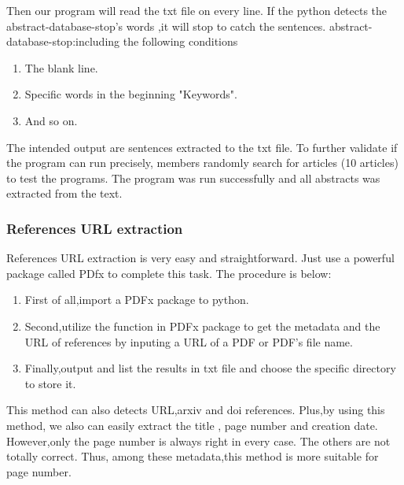 	
	Then our program will read the txt file on every line.
	If the python detects the abstract-database-stop's words ,it will stop to catch the sentences.
	abstract-database-stop:including the following conditions
	
	\begin{enumerate}
			
		\item The blank line.
		\item Specific words in the beginning "Keywords".
		\item And so on.
					
	\end{enumerate}
	
	The intended output are sentences extracted to the txt file.
	To further validate if the program can run precisely, members randomly search for articles (10 articles) to test the programs.
	The program was run successfully and all abstracts was extracted from the text.
	 	
\subsubsection{References URL extraction}

References URL extraction is very easy and straightforward.
Just use a powerful package called PDfx to complete this task.
The procedure is below:

\begin{enumerate}
	
	\item First of all,import a PDFx package to python.
	\item Second,utilize the function in PDFx package to get the metadata and the URL of references by inputing a URL of a PDF or PDF's file name.
	\item Finally,output and list the results in txt file and choose the specific directory to store it.

\end{enumerate}
 
This method can also detects URL,arxiv and doi references.  
Plus,by using this method, we  also can easily extract the title , page number and creation date. 
However,only the page number is always right in every case. The others are not totally correct. 
Thus, among these metadata,this method is more suitable for page number. 

